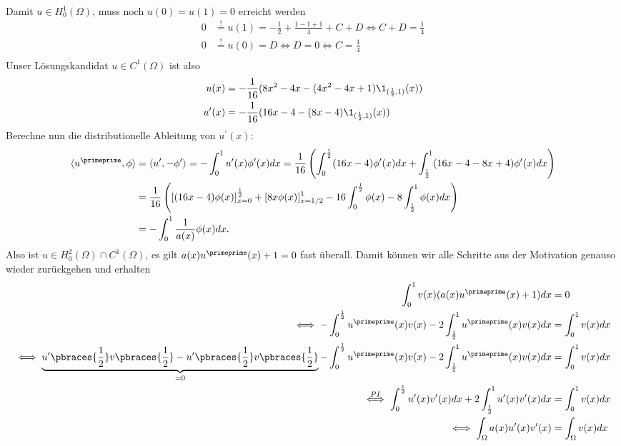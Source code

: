 \begin{solution}
Damit $u \in H_0^1(\Omega)$, muss noch $u(0) = u(1) = 0$ erreicht werden
\begin{align*}
  0 &\stackrel{!}{=} u(1) = -\frac{1}{2} + \frac{1-1 + 1}{4} + C + D \iff C + D = \frac{1}{4} \\
  0 &\stackrel{!}{=} u(0) = D \iff D = 0 \iff C = \frac{1}{4} \\
\end{align*}
Unser Lösungskandidat $u \in C^1(\Omega)$ ist also
\begin{align*}
  u(x) &= -\frac{1}{16}(8x^2-4x - (4x^2-4x+1)\1_{(\frac{1}{2},1)}(x)) \\
  u^{\prime}(x) &= -\frac{1}{16}(16x - 4 - (8x-4)\1_{(\frac{1}{2},1)}(x))
\end{align*}
Berechne nun die distributionelle Ableitung von $u^{\prime}(x)$:
\begin{align*}
  \langle u^{\primeprime}, \phi \rangle &= \langle u^{\prime}, -\phi^{\prime}\rangle
  = -\int_0^1 u^{\prime}(x)\phi^{\prime}(x) dx =
  \frac{1}{16}\left(\int_0^{\frac{1}{2}}(16x-4)\phi^{\prime}(x) dx +
  \int_{\frac{1}{2}}^1(16x-4-8x+4)\phi^{\prime}(x) dx\right) \\
  &= \frac{1}{16}\left([(16x-4)\phi(x)]_{x=0}^{\frac{1}{2}} + [8x\phi(x)]_{x=1/2}^{1} -
  16\int_0^{\frac{1}{2}}\phi(x) - 8\int_{\frac{1}{2}}^1\phi(x)dx\right) \\
  &= -\int_0^1 \frac{1}{a(x)}\phi(x) dx.
\end{align*}
Also ist $u \in H_0^2(\Omega) \cap C^1(\Omega)$, es gilt $a(x)u^{\primeprime}(x) + 1 = 0$
fast überall. Damit können wir alle Schritte aus der Motivation genauso wieder
zurückgehen und erhalten
\begin{align*}
  \int_0^1 v(x)(a(x)u^{\primeprime}(x) + 1) dx &= 0 \\
  \iff - \int_0^{\frac{1}{2}}u^{\primeprime}(x)v(x) -2\int_{\frac{1}{2}}^1 u^{\primeprime}(x)v(x) dx
  &= \int_0^1 v(x) dx \\
   \iff \underbrace{u^{\prime}\pbraces{\frac{1}{2}}v\pbraces{\frac{1}{2}} - u^{\prime}\pbraces{\frac{1}{2}}v\pbraces{\frac{1}{2}}}_{=0} - \int_0^{\frac{1}{2}}u^{\primeprime}(x)v(x)
  -2 \int_{\frac{1}{2}}^1 u^{\primeprime}(x)v(x) dx  &=
  \int_0^1 v(x) dx \\
  \stackrel{PI}{\iff} \int_0^{\frac{1}{2}} u^{\prime}(x)v^{\prime}(x)dx +
  2\int_{\frac{1}{2}}^1 u^{\prime}(x)v^{\prime}(x) dx &= \int_0^1 v(x) dx \\
  \iff \int_\Omega a(x)u^{\prime}(x)v^{\prime}(x) &= \int_\Omega v(x) dx
\end{align*}
\end{solution}

